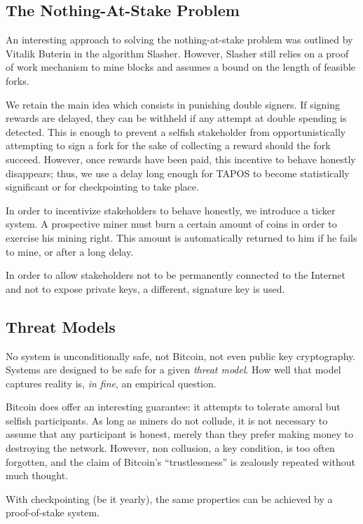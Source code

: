 \documentclass[letterpaper]{article}
\begin{document}
\subsection{The Nothing-At-Stake Problem}
An interesting approach to solving the nothing-at-stake problem was
outlined by Vitalik Buterin in the algorithm Slasher\cite{Slasher}.
However, Slasher still relies on a proof of work mechanism to mine blocks
and assumes a bound on the length of feasible forks.

We retain the main idea which consists in punishing double signers.
If signing rewards are delayed, they can be withheld
if any attempt at double spending is detected.
This is enough to prevent a selfish stakeholder
from opportunistically attempting to sign a fork
for the sake of collecting a reward should the fork succeed.
However, once rewards have been paid,
this incentive to behave honestly disappears;
thus, we use a delay long enough for TAPOS to become
statistically significant or for checkpointing to take place.

In order to incentivize stakeholders to behave honestly,
we introduce a ticker system. A prospective miner must 
burn a certain amount of coins in order to exercise his
mining right. This amount is automatically returned to
him if he fails to mine, or after a long delay.

In order to allow stakeholders not to be permanently connected
to the Internet and not to expose private keys, a different,
signature key is used.

\subsection{Threat Models}
No system is unconditionally safe, not Bitcoin, not even public key
cryptography. Systems are designed to be safe for a given \emph{threat model}. How well
that model captures reality is, \emph{in fine}, an empirical question.

Bitcoin does offer an interesting guarantee: it attempts to tolerate amoral
but selfish participants. As long as miners do not collude, it is not necessary
to assume that any participant is honest, merely than they prefer making money
to destroying the network. However, non collusion, a key condition, is too
often forgotten, and the claim of Bitcoin's
``trustlessness'' is zealously repeated without much thought.

With checkpointing (be it yearly), the same properties can be achieved by
a proof-of-stake system.
\end{document}

